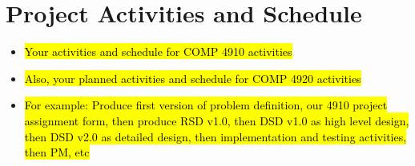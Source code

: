 \section{Project Activities and Schedule}


\begin{itemize}
	\item \hl{Your activities and schedule for COMP 4910 activities}
	\item \hl{Also, your planned activities and schedule for COMP 4920 activities}
	\item \hl{For example: Produce first version of problem definition, our 4910 project assignment form, then produce RSD v1.0, then DSD v1.0 as high level design, then DSD v2.0 as detailed design, then implementation and testing activities, then PM, etc}
\end{itemize}

